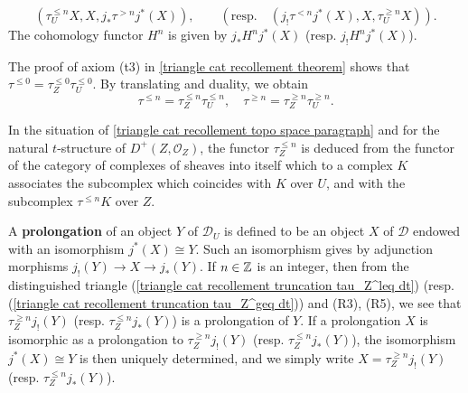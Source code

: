 \begin{equation}\label{triangle cat recollement truncation tau_U dt}
(\tau^{\leq n}_UX,X,j_*\tau^{>n}j^*(X)),\quad\quad (\text{resp.}\quad (j_!\tau^{<n}j^*(X),X,\tau^{\geq n}_UX)).
\end{equation}
The cohomology functor $H^n$ is given by $j_*H^nj^*(X)$ (resp. $j_!H^nj^*(X)$).\par
The proof of axiom (t3) in \cref{triangle cat recollement theorem} shows that $\tau^{\leq 0}=\tau^{\leq 0}_Z\tau^{\leq 0}_U$. By translating and duality, we obtain
\begin{equation}\label{triangle cat recollement truncation functor decomposition}
\tau^{\leq n}=\tau^{\leq n}_Z\tau^{\leq n}_U,\quad \tau^{\geq n}=\tau^{\geq n}_Z\tau^{\geq n}_U.
\end{equation}

\begin{example}\label{triangle cat recollement truncation tau_Z for topo space}
In the situation of \ref{triangle cat recollement topo space paragraph} and for the natural $t$-structure of $D^+(Z,\mathscr{O}_Z)$, the functor $\tau_Z^{\leq n}$ is deduced from the functor of the category of complexes of sheaves into itself which to a complex $K$ associates the subcomplex which coincides with $K$ over $U$, and with the subcomplex $\tau^{\leq n}K$ over $Z$.
\end{example}

A \textbf{prolongation} of an object $Y$ of $\mathcal{D}_U$ is defined to be an object $X$ of $\mathcal{D}$ endowed with an isomorphism $j^*(X)\cong Y$. Such an isomorphism gives by adjunction morphisms $j_!(Y)\to X\to j_*(Y)$. If $n\in\mathbb{Z}$ is an integer, then from the distinguished triangle (\ref{triangle cat recollement truncation tau_Z^leq dt}) (resp. (\ref{triangle cat recollement truncation tau_Z^geq dt})) and (R3), (R5), we see that $\tau^{\geq n}_Zj_!(Y)$ (resp. $\tau_Z^{\leq n}j_*(Y)$) is a prolongation of $Y$. If a prolongation $X$ is isomorphic as a prolongation to $\tau^{\geq n}_Zj_!(Y)$ (resp. $\tau_Z^{\leq n}j_*(Y)$), the isomorphism $j^*(X)\cong Y$ is then uniquely determined, and we simply write $X=\tau^{\geq n}_Zj_!(Y)$ (resp. $\tau_Z^{\leq n}j_*(Y)$).

